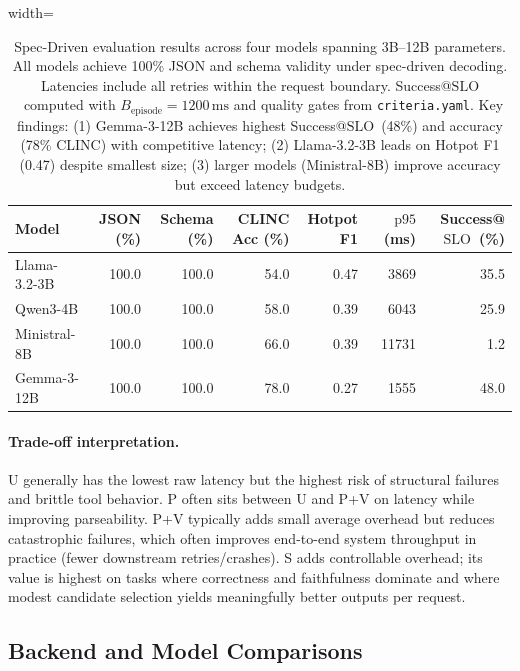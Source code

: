 \documentclass[11pt]{article}
\newcommand{\pninetyfive}{\ensuremath{\mathrm{p95}}}
\newcommand{\slo}{\ensuremath{\mathrm{SLO}}}
\begin{document}
\begin{table}[t]
\centering
\small
\begin{adjustbox}{width=\linewidth}
\begin{tabular}{@{}lrrrrrr@{}}
\toprule
\textbf{Model} & \textbf{JSON (\%)} & \textbf{Schema (\%)} & \textbf{CLINC Acc (\%)} & \textbf{Hotpot F1} & \textbf{\pninetyfive\ (ms)} & \textbf{Success@\slo\ (\%)} \\
\midrule
Llama-3.2-3B & 100.0 & 100.0 & 54.0 & 0.47 & 3869 & 35.5 \\
Qwen3-4B & 100.0 & 100.0 & 58.0 & 0.39 & 6043 & 25.9 \\
Ministral-8B & 100.0 & 100.0 & 66.0 & 0.39 & 11731 & 1.2 \\
Gemma-3-12B & 100.0 & 100.0 & 78.0 & 0.27 & 1555 & 48.0 \\
\bottomrule
\end{tabular}
\end{adjustbox}
\caption{Spec-Driven evaluation results across four models spanning 3B--12B parameters.
All models achieve 100\% JSON and schema validity under spec-driven decoding.
Latencies include all retries within the request boundary.
Success@\slo\ computed with $B_{\text{episode}}=1200\,\mathrm{ms}$ and quality gates from \texttt{criteria.yaml}.
Key findings: (1) Gemma-3-12B achieves highest Success@\slo\ (48\%) and accuracy (78\% CLINC) with competitive latency; (2) Llama-3.2-3B leads on Hotpot F1 (0.47) despite smallest size; (3) larger models (Ministral-8B) improve accuracy but exceed latency budgets.}
\label{tab:config-ablation}
\end{table}

\paragraph{Trade-off interpretation.}
U generally has the lowest raw latency but the highest risk of structural failures and brittle tool behavior.
P often sits between U and P+V on latency while improving parseability.
P+V typically adds small average overhead but reduces catastrophic failures, which often improves end-to-end system throughput in practice (fewer downstream retries/crashes).
S adds controllable overhead; its value is highest on tasks where correctness and faithfulness dominate and where modest candidate selection yields meaningfully better outputs per request.

\subsection{Backend and Model Comparisons}
\label{sec:results-backends}
\end{document}
